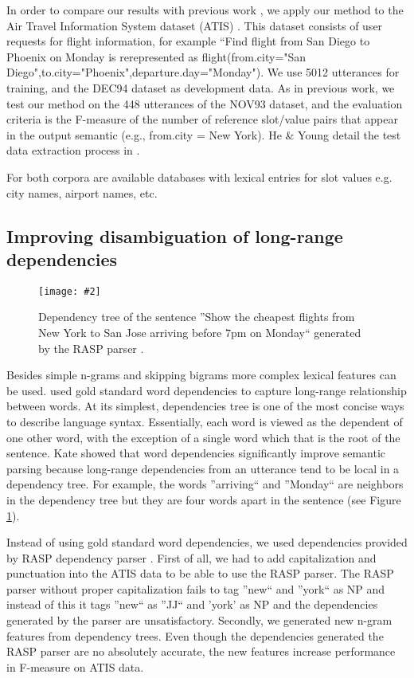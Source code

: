 \documentclass[11pt]{article}
\newcommand{\fgrparam}[4]{
  \begin{figure}[htbp]
    \begin{center}
      \leavevmode
      \texttt{[image: \#2]}
    \end{center}
    \caption{#4}
    \label{#3}
  \end{figure}
}
\begin{document}
In order to compare our results with previous work \cite{he06,zettlemoyer07},
we apply our method to the Air Travel Information System dataset
(ATIS) \cite{atis94}. This dataset consists of user requests for flight information, for example ``Find flight from San Diego to Phoenix on Monday is rerepresented as flight(from.city="San Diego",to.city="Phoenix",departure.day="Monday"). We use 5012 utterances for training, and the DEC94 dataset as development data. As in previous work, we test our method on the 448 utterances of the NOV93 dataset, and the evaluation criteria is the F-measure of the number of reference slot/value pairs that appear in the output semantic (e.g., from.city = New York). He \& Young detail the test data extraction process in \cite{he05}.

For both corpora are available databases with lexical entries for slot values e.g. city names, airport names, etc. 

\subsection{Improving disambiguation of long-range dependencies}

\fgrparam{width=8cm}{./fig/dep-tree.pdf}{fig:dep:tree}{Dependency tree of the sentence ''Show the cheapest flights from New York to San Jose arriving before 7pm on Monday`` generated by the RASP parser \cite{rasp06}.}

Besides simple n-grams and skipping bigrams more complex lexical features can be used. \cite{kate08} used gold standard word dependencies to capture long-range relationship between words. At its simplest, dependencies tree is one of the most concise ways to describe language syntax. Essentially, each word is viewed as the dependent of one other word, with the exception of a single word which that is the root of the sentence. Kate showed that word dependencies significantly improve semantic parsing because long-range dependencies from an utterance tend to be local in a dependency tree. For example, the words ''arriving`` and ''Monday`` are neighbors in the dependency tree but they are four words apart in the sentence (see Figure \ref{fig:dep:tree}).

Instead of using gold standard word dependencies, we used dependencies provided by RASP dependency parser \cite{rasp06}. First of all, we had to add capitalization and punctuation into the ATIS data to be able to use the RASP parser. The RASP parser without proper capitalization fails to tag ''new`` and ''york`` as NP and instead of this it tags ''new`` as ''JJ`` and 'york' as NP and the dependencies generated by the parser are unsatisfactory. Secondly, we generated new n-gram features from dependency trees. Even though the dependencies generated the RASP parser are no absolutely accurate, the new features increase performance in F-measure on ATIS data. 
\end{document}
